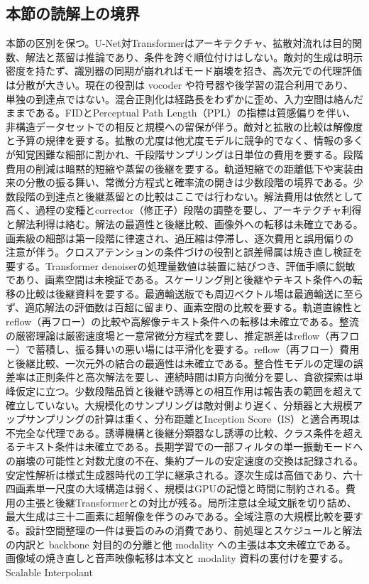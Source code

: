 \documentclass[lualatex,a4paper,10pt]{jlreq}
\begin{document}
\subsection{本節の読解上の境界}
本節の区別を保つ。U-Net対Transformerはアーキテクチャ、拡散対流れは目的関数、解法と蒸留は推論であり、条件を跨ぐ順位付けはしない。敵対的生成は明示密度を持たず、識別器の同期が崩れればモード崩壊を招き、高次元での代理評価は分散が大きい\autocite{btd013}。現在の役割は vocoder や符号器や後学習の混合利用であり、単独の到達点ではない\autocite{btd013,btd014}。混合正則化は経路長をわずかに歪め、入力空間は絡んだままである\autocite{btd015}。FIDとPerceptual Path Length（PPL）の指標は質感偏りを伴い、非構造データセットでの相反と規模への留保が伴う\autocite{btd016}。敵対と拡散の比較は解像度と予算の規律を要する。拡散の尤度は他尤度モデルに競争的でなく、情報の多くが知覚困難な細部に割かれ、千段階サンプリングは日単位の費用を要する\autocite{btd019}。段階費用の削減は暗黙的短縮や蒸留の後継を要する\autocite{btd020}。軌道短縮での距離低下や実装由来の分散の振る舞い、常微分方程式と確率流の開きは少数段階の境界である\autocite{btd020}。少数段階の到達点と後継蒸留との比較はここでは行わない。解法費用は依然として高く、過程の変種とcorrector（修正子）段階の調整を要し、アーキテクチャ利得と解法利得は絡む\autocite{btd021}。解法の最適性と後継比較、画像外への転移は未確立である。画素級の細部は第一段階に律速され、過圧縮は停滞し、逐次費用と誤用偏りの注意が伴う\autocite{btd023}。クロスアテンションの条件づけの役割と誤差帰属は焼き直し検証を要する。Transformer denoiserの処理量数値は装置に結びつき、評価手順に鋭敏であり、画素空間は未検証である\autocite{btd025}。スケーリング則と後継やテキスト条件への転移の比較は後継資料を要する。最適輸送版でも周辺ベクトル場は最適輸送に至らず、適応解法の評価数は百超に留まり、画素空間の比較を要する\autocite{btd027}。軌道直線性とreflow（再フロー）の比較や高解像テキスト条件への転移は未確立である。整流の厳密理論は厳密速度場と一意常微分方程式を要し、推定誤差はreflow（再フロー）で蓄積し、振る舞いの悪い場には平滑化を要する\autocite{btd028}。reflow（再フロー）費用と後継比較、一次元外の結合の最適性は未確立である。整合性モデルの定理の誤差率は正則条件と高次解法を要し、連続時間は順方向微分を要し、貪欲探索は単峰仮定に立つ\autocite{btd029}。少数段階品質と後継や誘導との相互作用は報告表の範囲を超えて確立していない。大規模化のサンプリングは敵対側より遅く、分類器と大規模アップサンプリングの計算は重く、分布距離とInception Score（IS）と適合再現は不完全な代理である\autocite{btd020}。誘導機構と後継分類器なし誘導の比較、クラス条件を超えるテキスト条件は未確立である。長期学習での一部フィルタの単一振動モードへの崩壊の可能性と対数尤度の不在、集約プールの安定速度の交換は記録される\autocite{btd014}。安定性解析は様式生成器時代の工学に継承される。逐次生成は高価であり、六十四画素単一尺度の大域構造は弱く、規模はGPUの記憶と時間に制約される\autocite{btd017}。費用の主張と後継Transformerとの対比が残る。局所注意は全域文脈を切り詰め、最大生成は三十二画素に超解像を伴うのみである\autocite{btd018}。全域注意の大規模比較を要する。設計空間整理の一件は要旨のみの消費であり、前処理とスケジュールと解法の内訳と backbone 対目的の分離と他 modality への主張は本文未確立である\autocite{btd022}。画像域の焼き直しと音声映像転移は本文と modality 資料の裏付けを要する。Scalable Interpolant 
\end{document}
